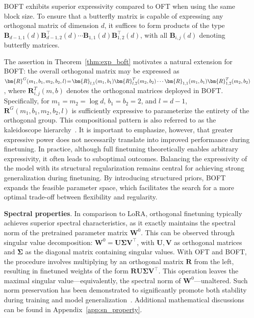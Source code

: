 \begin{theorem}\label{thm:exp_boft}
    BOFT exhibits superior expressivity compared to OFT when using the same block size. To ensure that a butterfly matrix is capable of expressing any orthogonal matrix of dimension $d$, it suffices to form products of the type $\bm{B}_{d-1,1}(d)\bm{B}^\top_{d-1,2}(d)\cdots\bm{B}_{1,1}(d)\bm{B}^\top_{1,2}(d)$, with all $\bm{B}_{i,j}(d)$ denoting butterfly matrices.
\end{theorem}

The assertion in Theorem~\ref{thm:exp_boft} motivates a natural extension for BOFT: the overall orthogonal matrix may be expressed as $\thickmuskip=2mu \medmuskip=2mu \bm{R}^G(m_1,b_1,m_2,b_2,l)=\bm{R}_{l,1}(m_1,b_1)\bm{R}_{l,2}^T(m_2,b_2)\cdots\bm{R}_{1,1}(m_1,b_1)\bm{R}_{1,2}^T(m_2,b_2)$, where $\bm{R}_{i,j}^T(m,b)$ denotes the orthogonal matrices deployed in BOFT. Specifically, for $m_1=m_2=\log d$, $b_1=b_2=2$, and $l=d-1$, $\bm{R}^G(m_1,b_1,m_2,b_2,l)$ is sufficiently expressive to parameterize the entirety of the orthogonal group. This compositional pattern is also referred to as the kaleidoscope hierarchy~\cite{dao2019kaleidoscope}. It is important to emphasize, however, that greater expressive power does not necessarily translate into improved performance during finetuning. In practice, although full finetuning theoretically enables arbitrary expressivity, it often leads to suboptimal outcomes. Balancing the expressivity of the model with its structural regularization remains central for achieving strong generalization during finetuning. By introducing structured priors, BOFT expands the feasible parameter space, which facilitates the search for a more optimal trade-off between flexibility and regularity.

\textbf{Spectral properties}. In comparison to LoRA, orthogonal finetuning typically achieves superior spectral characteristics, as it exactly maintains the spectral norm of the pretrained parameter matrix $\bm{W}^0$. This can be observed through singular value decomposition: $\bm{W}^0=\bm{U}\bm{\Sigma}\bm{V}^\top$, with $\bm{U},\bm{V}$ as orthogonal matrices and $\bm{\Sigma}$ as the diagonal matrix containing singular values. With OFT and BOFT, the procedure involves multiplying by an orthogonal matrix $\bm{R}$ from the left, resulting in finetuned weights of the form $\bm{R}\bm{U}\bm{\Sigma}\bm{V}^\top$. This operation leaves the maximal singular value—equivalently, the spectral norm of $\bm{W}^0$—unaltered. Such norm preservation has been demonstrated to significantly promote both stability during training and model generalization~\cite{miyato2018spectral,yoshida2017spectral}. Additional mathematical discussions can be found in Appendix~\ref{app:sn_property}.

